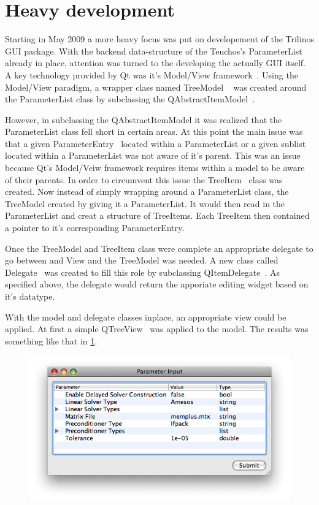 \section{Heavy development}
Starting in May 2009 a more heavy focus was put on developement of the Trilinos GUI package.
With the backend data-structure of the Teuchos's ParameterList already in place, attention
was turned to the developing the actually GUI itself. A key technology provided by Qt was it's Model/View
framework~\cite{QtModelView}. Using the Model/View paradigm, a wrapper class named TreeModel
~\cite{TreeModel} was created around the ParameterList class by subclassing the 
QAbstractItemModel~\cite{QAbstractItemModel}.

However, in subclassing the QAbstractItemModel it was realized that the ParameterList class fell short in
certain areas. At this point the main issue was that a given ParameterEntry~\cite{ParameterEntry} located within
a ParameterList or a given sublist located within a ParameterList was not aware of it's parent.
This was an issue because Qt's Model/Veiw framework requires items within a model to be aware of
their parents. In order to circumvent this issue the TreeItem~\cite{TreeItem} class was created. Now 
instead of simply wrapping around a ParameterList class, the TreeModel created by giving it a ParameterList.
It would then read in the ParameterList and creat a structure of TreeItems.  Each TreeItem then contained a pointer 
to it's corresponding ParameterEntry.

Once the TreeModel and TreeItem class were complete an appropriate delegate to go between and View
and the TreeModel was needed. A new class called Delegate~\cite{Delegate} was created to fill this
role by subclassing QItemDelegate~\cite{QItemDelegate}. As specified above, the delegate would return
the apporiate editing widget based on it's datatype.

With the model and delegate classes inplace, an appropriate view could be applied. At first a simple
QTreeView~\cite{QTreeView} was applied to the model. The results was something like that in \ref{treeviewFig}.
	\begin{figure}
		\centering
		\label{treeviewFig}
		\caption[A simple Tree View]
		\includegraphics{graphics/treeview}
	\end{figure}


